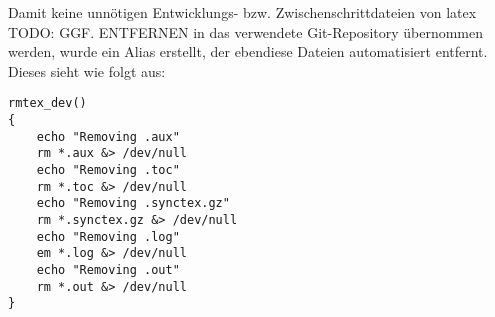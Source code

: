 Damit keine unnötigen Entwicklungs- bzw. Zwischenschrittdateien von latex TODO: GGF. ENTFERNEN in das verwendete Git-Repository übernommen werden, wurde ein Alias erstellt, der ebendiese Dateien automatisiert entfernt. Dieses sieht wie folgt aus:
\begin{lstlisting}[frame=single]
rmtex_dev()
{
	echo "Removing .aux"
	rm *.aux &> /dev/null
	echo "Removing .toc"
	rm *.toc &> /dev/null
	echo "Removing .synctex.gz"
	rm *.synctex.gz &> /dev/null
	echo "Removing .log"
	em *.log &> /dev/null
	echo "Removing .out"
	rm *.out &> /dev/null
}
\end{lstlisting}